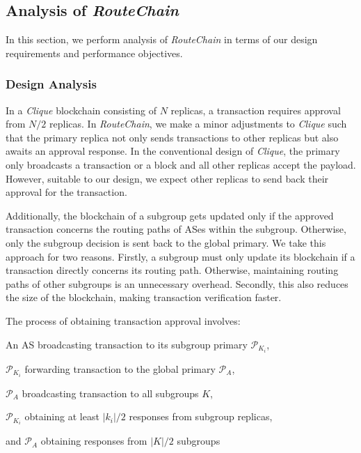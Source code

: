 \documentclass[5p]{elsarticle}
\newcommand{\rc}{{{\em RouteChain}}\xspace}
\begin{document}
\subsection{Analysis of {\em RouteChain}} \label{sec:ana}
In this section, we perform analysis of \rc in terms of our design requirements and performance objectives. 
\subsubsection{Design Analysis}\label{sec:da}
In a {\em Clique} blockchain consisting of $N$ replicas, a transaction requires approval from $N/2$ replicas. In \rc, we make a minor adjustments to {\em Clique} such that the primary replica not only sends transactions to other replicas but also awaits an approval response. In the conventional design of {\em Clique}, the primary only broadcasts a transaction or a block and all other replicas accept the payload. However, suitable to our design, we expect other replicas to send back their approval for the transaction.

Additionally, the blockchain of a subgroup gets updated only if the approved transaction concerns the routing paths of ASes within the subgroup. Otherwise, only the subgroup decision is sent back to the global primary. We take this approach for two reasons. Firstly, a subgroup must only update its blockchain if a transaction directly concerns its routing path. Otherwise,  maintaining routing paths of other subgroups is an unnecessary overhead. Secondly, this also reduces the size of the blockchain, making transaction verification faster. 

The process of obtaining transaction approval involves:
\begin{enumerate*}
    \item An AS broadcasting transaction to its subgroup primary $\mathcal{P}_{K_{i}}$,
    \item $\mathcal{P}_{K_{i}}$ forwarding transaction to the global primary $\mathcal{P}_{A}$,
    \item $\mathcal{P}_{A}$ broadcasting transaction to all subgroups $K$, 
    \item $\mathcal{P}_{K_{i}}$ obtaining at least $|k_{i}|/2$ responses from subgroup replicas,
    \item and $\mathcal{P}_{A}$ obtaining responses from $|K|/2$ subgroups
\end{enumerate*}
\end{document}
